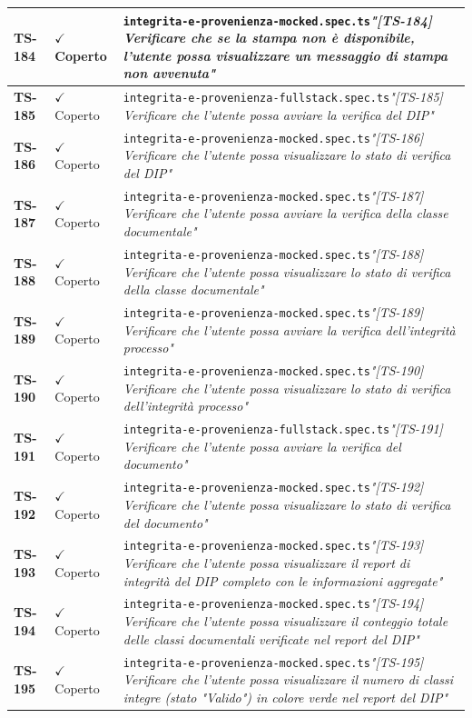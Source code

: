 \documentclass[a4paper,12pt]{article}
\newcommand{\ok}{\textcolor{green!60!black}{$\checkmark$ Coperto}}
\newcommand{\f}[1]{\nolinkurl{#1}\newline}
\newcommand{\q}[1]{\textit{#1}}
\begin{document}
\begin{longtable}{|p{1.5cm}|p{3.0cm}|p{10.5cm}|}
\textbf{TS-184} & \ok & \f{integrita-e-provenienza-mocked.spec.ts}\q{"[TS-184] Verificare che se la stampa non è disponibile, l'utente possa visualizzare un messaggio di stampa non avvenuta"} \\ \hline
\textbf{TS-185} & \ok & \f{integrita-e-provenienza-fullstack.spec.ts}\q{"[TS-185] Verificare che l'utente possa avviare la verifica del DIP"} \\ \hline
\textbf{TS-186} & \ok & \f{integrita-e-provenienza-mocked.spec.ts}\q{"[TS-186] Verificare che l'utente possa visualizzare lo stato di verifica del DIP"} \\ \hline
\textbf{TS-187} & \ok & \f{integrita-e-provenienza-mocked.spec.ts}\q{"[TS-187] Verificare che l'utente possa avviare la verifica della classe documentale"} \\ \hline
\textbf{TS-188} & \ok & \f{integrita-e-provenienza-mocked.spec.ts}\q{"[TS-188] Verificare che l'utente possa visualizzare lo stato di verifica della classe documentale"} \\ \hline
\textbf{TS-189} & \ok & \f{integrita-e-provenienza-mocked.spec.ts}\q{"[TS-189] Verificare che l'utente possa avviare la verifica dell'integrità processo"} \\ \hline
\textbf{TS-190} & \ok & \f{integrita-e-provenienza-mocked.spec.ts}\q{"[TS-190] Verificare che l'utente possa visualizzare lo stato di verifica dell'integrità processo"} \\ \hline
\textbf{TS-191} & \ok & \f{integrita-e-provenienza-fullstack.spec.ts}\q{"[TS-191] Verificare che l'utente possa avviare la verifica del documento"} \\ \hline
\textbf{TS-192} & \ok & \f{integrita-e-provenienza-mocked.spec.ts}\q{"[TS-192] Verificare che l'utente possa visualizzare lo stato di verifica del documento"} \\ \hline
\textbf{TS-193} & \ok & \f{integrita-e-provenienza-mocked.spec.ts}\q{"[TS-193] Verificare che l'utente possa visualizzare il report di integrità del DIP completo con le informazioni aggregate"} \\ \hline
\textbf{TS-194} & \ok & \f{integrita-e-provenienza-mocked.spec.ts}\q{"[TS-194] Verificare che l'utente possa visualizzare il conteggio totale delle classi documentali verificate nel report del DIP"} \\ \hline
\textbf{TS-195} & \ok & \f{integrita-e-provenienza-mocked.spec.ts}\q{"[TS-195] Verificare che l'utente possa visualizzare il numero di classi integre (stato "Valido") in colore verde nel report del DIP"} \\ \hline

\end{longtable}
\end{document}
